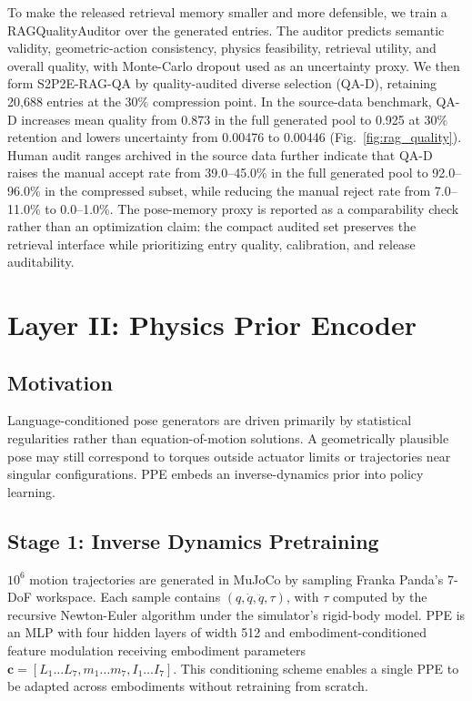 \documentclass[12pt]{article}
\begin{document}
To make the released retrieval memory smaller and more defensible, we train a RAGQualityAuditor over the generated entries. The auditor predicts semantic validity, geometric-action consistency, physics feasibility, retrieval utility, and overall quality, with Monte-Carlo dropout used as an uncertainty proxy. We then form S2P2E-RAG-QA by quality-audited diverse selection (QA-D), retaining 20,688 entries at the 30\% compression point. In the source-data benchmark, QA-D increases mean quality from 0.873 in the full generated pool to 0.925 at 30\% retention and lowers uncertainty from 0.00476 to 0.00446 (Fig.~\ref{fig:rag_quality}). Human audit ranges archived in the source data further indicate that QA-D raises the manual accept rate from 39.0--45.0\% in the full generated pool to 92.0--96.0\% in the compressed subset, while reducing the manual reject rate from 7.0--11.0\% to 0.0--1.0\%. The pose-memory proxy is reported as a comparability check rather than an optimization claim: the compact audited set preserves the retrieval interface while prioritizing entry quality, calibration, and release auditability.

\section{Layer II: Physics Prior Encoder}

\subsection{Motivation}

Language-conditioned pose generators are driven primarily by statistical regularities rather than equation-of-motion solutions. A geometrically plausible pose may still correspond to torques outside actuator limits or trajectories near singular configurations. PPE embeds an inverse-dynamics prior into policy learning.

\subsection{Stage 1: Inverse Dynamics Pretraining}

$10^6$ motion trajectories are generated in MuJoCo by sampling Franka Panda's 7-DoF workspace. Each sample contains $(q, \dot{q}, \ddot{q}, \tau)$, with $\tau$ computed by the recursive Newton-Euler algorithm under the simulator's rigid-body model. PPE is an MLP with four hidden layers of width 512 and embodiment-conditioned feature modulation receiving embodiment parameters $\mathbf{c} = [L_1\ldots L_7, m_1\ldots m_7, I_1\ldots I_7]$. This conditioning scheme enables a single PPE to be adapted across embodiments without retraining from scratch.
\end{document}
